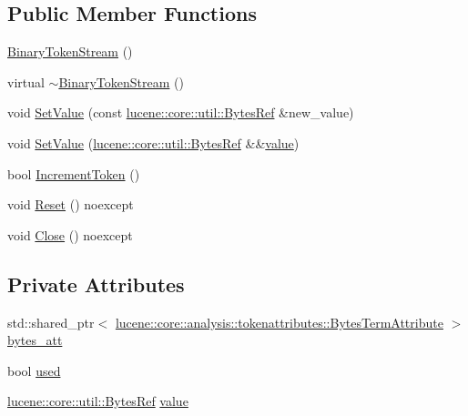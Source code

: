 \subsection*{Public Member Functions}
\begin{DoxyCompactItemize}
\item 
\mbox{\hyperlink{classlucene_1_1core_1_1document_1_1Field_1_1BinaryTokenStream_a24a97190071bfedab20a0db755928732}{Binary\+Token\+Stream}} ()
\item 
virtual \mbox{\hyperlink{classlucene_1_1core_1_1document_1_1Field_1_1BinaryTokenStream_aac6e4bf25db86723dba21faf789de9d0}{$\sim$\+Binary\+Token\+Stream}} ()
\item 
void \mbox{\hyperlink{classlucene_1_1core_1_1document_1_1Field_1_1BinaryTokenStream_aafa75f99cd70d8915eafb091684d1f7b}{Set\+Value}} (const \mbox{\hyperlink{classlucene_1_1core_1_1util_1_1BytesRef}{lucene\+::core\+::util\+::\+Bytes\+Ref}} \&new\+\_\+value)
\item 
void \mbox{\hyperlink{classlucene_1_1core_1_1document_1_1Field_1_1BinaryTokenStream_a757ff56ebf0408208560de573ccfce78}{Set\+Value}} (\mbox{\hyperlink{classlucene_1_1core_1_1util_1_1BytesRef}{lucene\+::core\+::util\+::\+Bytes\+Ref}} \&\&\mbox{\hyperlink{classlucene_1_1core_1_1document_1_1Field_1_1BinaryTokenStream_af19e816feca1fda691a9f8ad505ac97a}{value}})
\item 
bool \mbox{\hyperlink{classlucene_1_1core_1_1document_1_1Field_1_1BinaryTokenStream_a98dee5401b26bdaab935f66a37abae29}{Increment\+Token}} ()
\item 
void \mbox{\hyperlink{classlucene_1_1core_1_1document_1_1Field_1_1BinaryTokenStream_a99e2c5a8f41c6509ae7a43ade13c30bf}{Reset}} () noexcept
\item 
void \mbox{\hyperlink{classlucene_1_1core_1_1document_1_1Field_1_1BinaryTokenStream_a44c200cf1139a926308afdcf27c7638d}{Close}} () noexcept
\end{DoxyCompactItemize}
\subsection*{Private Attributes}
\begin{DoxyCompactItemize}
\item 
std\+::shared\+\_\+ptr$<$ \mbox{\hyperlink{classlucene_1_1core_1_1analysis_1_1tokenattributes_1_1BytesTermAttribute}{lucene\+::core\+::analysis\+::tokenattributes\+::\+Bytes\+Term\+Attribute}} $>$ \mbox{\hyperlink{classlucene_1_1core_1_1document_1_1Field_1_1BinaryTokenStream_a3a9a7f10f40cde8b2c37b9e65340083c}{bytes\+\_\+att}}
\item 
bool \mbox{\hyperlink{classlucene_1_1core_1_1document_1_1Field_1_1BinaryTokenStream_a56fb807096b736bcc128ced9cabf98f0}{used}}
\item 
\mbox{\hyperlink{classlucene_1_1core_1_1util_1_1BytesRef}{lucene\+::core\+::util\+::\+Bytes\+Ref}} \mbox{\hyperlink{classlucene_1_1core_1_1document_1_1Field_1_1BinaryTokenStream_af19e816feca1fda691a9f8ad505ac97a}{value}}
\end{DoxyCompactItemize}

